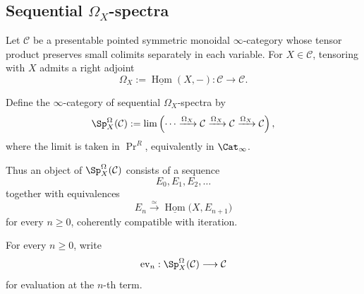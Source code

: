 \subsection{Sequential \texorpdfstring{$\Omega_X$}{Omega-X}-spectra}

Let \(\mathcal C\) be a presentable pointed symmetric monoidal
\(\infty\)-category whose tensor product preserves small colimits separately
in each variable.  For \(X\in\mathcal C\), tensoring with \(X\) admits a
right adjoint
\[
    \Omega_X
    :=
    \underline{\operatorname{Hom}}(X,-):
    \mathcal C
    \longrightarrow
    \mathcal C.
\]

\begin{definition}
\label{def:X-prespectrum}
Define the \(\infty\)-category of sequential \(\Omega_X\)-spectra by
\[
    \Sp_X^\Omega(\mathcal C)
    :=
    \lim
    \left(
      \cdots
      \xrightarrow{\Omega_X}
      \mathcal C
      \xrightarrow{\Omega_X}
      \mathcal C
      \xrightarrow{\Omega_X}
      \mathcal C
    \right),
\]
where the limit is taken in \(\Pr^R\), equivalently in
\(\Cat_\infty\).

Thus an object of \(\Sp_X^\Omega(\mathcal C)\) consists of a sequence
\[
    E_0,E_1,E_2,\ldots
\]
together with equivalences
\[
    E_n
    \xrightarrow{\simeq}
    \underline{\operatorname{Hom}}
    \bigl(
      X,E_{n+1}
    \bigr)
\]
for every \(n\geq0\), coherently compatible with iteration.

For every \(n\geq0\), write
\[
    \operatorname{ev}_n:
    \Sp_X^\Omega(\mathcal C)
    \longrightarrow
    \mathcal C
\]
for evaluation at the \(n\)-th term.
\end{definition}

